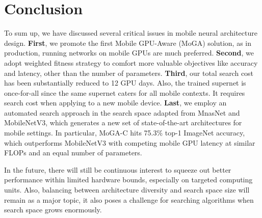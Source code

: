 \documentclass[letterpaper]{article} \usepackage{aaai20}  \usepackage{times}  \usepackage{helvet} \usepackage{courier}  \usepackage[hyphens]{url}  \usepackage{graphicx} \urlstyle{rm} \def\UrlFont{\rm}  \usepackage{graphicx}  \usepackage{amsmath}
\begin{document}
\section{Conclusion}
\label{sec:conc}
To sum up, we have discussed several critical issues in mobile neural architecture design. \textbf{First}, we promote the first Mobile GPU-Aware (MoGA) solution, as in production, running networks on mobile GPUs are much preferred. \textbf{Second},  we adopt weighted fitness strategy to comfort more valuable objectives like accuracy and latency, other than the number of parameters. \textbf{Third}, our total search cost has been substantially reduced to 12 GPU days. Also, the trained supernet is once-for-all since the same supernet caters for all mobile contexts. It requires  search cost when applying to a new mobile device. \textbf{Last}, we employ an automated search approach in the search space adapted from MnasNet and MobileNetV3, which generates a new set of state-of-the-art architectures for mobile settings. In particular, MoGA-C hits 75.3\% top-1 ImageNet accuracy, which outperforms MobileNetV3 with competing mobile GPU latency at similar FLOPs and an equal number of parameters.

In the future, there will still be continuous interest to squeeze out better performance within limited hardware bounds, especially on targeted computing units. Also, balancing between architecture diversity and search space size will remain as a major topic, it also poses a challenge for searching algorithms when search space grows enormously.



\end{document}
